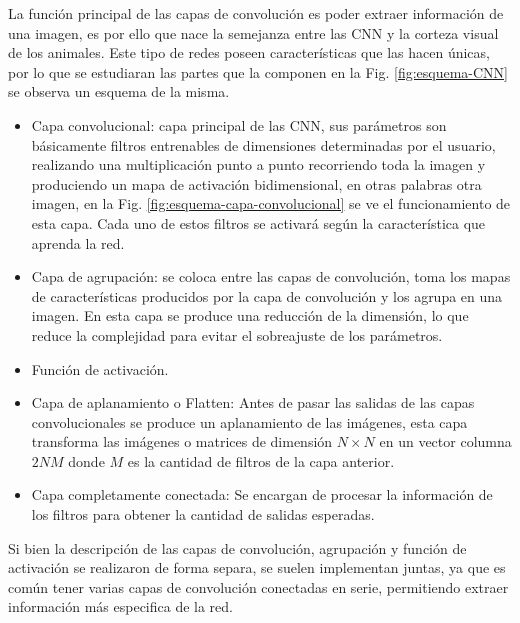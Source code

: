 La función principal de las capas de convolución es poder extraer información de una imagen, es por ello que nace la semejanza entre las CNN y la corteza visual de los animales.
Este tipo de redes poseen características que las hacen únicas, por lo que se estudiaran las partes que la componen en la Fig. \ref{fig:esquema-CNN} se observa un esquema de la misma.
\begin{itemize}
    \item Capa convolucional: capa principal de las CNN, sus parámetros son básicamente filtros entrenables de dimensiones determinadas por el
          usuario, realizando una multiplicación punto a punto recorriendo toda la imagen y produciendo un mapa de activación bidimensional, en otras palabras otra imagen, en la
          Fig. \ref{fig:esquema-capa-convolucional} se ve el funcionamiento de esta capa. Cada uno de estos filtros se activará según la característica que aprenda la red.
    \item Capa de agrupación: se coloca entre las capas de convolución, toma los mapas de características producidos por la capa de
          convolución y los agrupa en una imagen. En esta capa se produce una reducción de la dimensión, lo que reduce la complejidad para evitar el sobreajuste de los parámetros.
    \item Función de activación.
    \item Capa de aplanamiento o Flatten: Antes de pasar las salidas de las capas convolucionales se produce un aplanamiento de las imágenes, esta capa transforma las imágenes o matrices de dimensión $N \times N$ en un vector columna $2NM$ donde $M$ es la cantidad de filtros de la capa anterior.
    \item Capa completamente conectada: Se encargan de procesar la información de los filtros para obtener la cantidad de salidas esperadas.
\end{itemize}

Si bien la descripción de las capas de convolución, agrupación y función de activación se realizaron de forma separa, se suelen implementan juntas, ya que es común tener varias capas de convolución conectadas en serie, permitiendo extraer información más especifica de la red.

